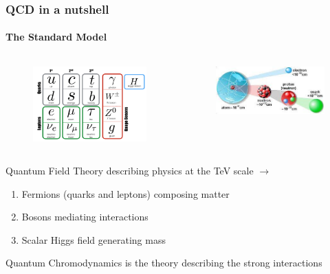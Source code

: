 \documentclass[aspectratio=43]{beamer}
\begin{document}
\begin{frame}
	
	\frametitle{QCD in a nutshell}
	\framesubtitle{The Standard Model}
	
	\begin{columns}

		
		\begin{figure}
			\includegraphics[width =6cm]{plots/section1/SM.png}
		\end{figure}

		
		\begin{figure}
			\includegraphics[width =5.75cm]{plots/section1/nucleus.jpeg}
		\end{figure}

	\end{columns}

	\vspace{0.5 cm}
		
	\footnotesize Quantum Field Theory describing physics at the TeV scale $\rightarrow$ \color{red}{less than a fermi!}
	
	\begin{enumerate}
		\item Fermions (quarks and leptons) composing matter
		\item Bosons mediating interactions
		\item Scalar Higgs field generating mass
	\end{enumerate}	

	Quantum Chromodynamics is the theory describing the strong interactions

\end{frame}
\end{document}
